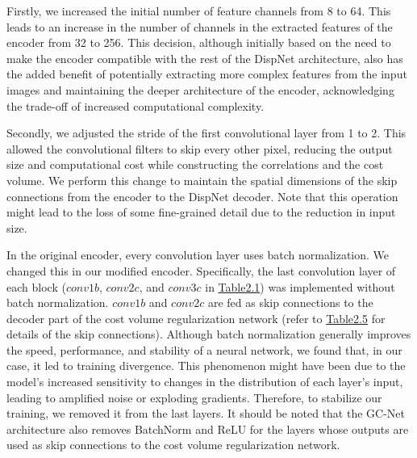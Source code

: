 \begin{enumerate}
    Firstly, we increased the initial number of feature channels from 8 to 64. This leads to an increase in the number of channels in the extracted features of the {\mvsn} encoder from 32 to 256. This decision, although initially based on the need to make the {\mvsn} encoder compatible with the rest of the DispNet architecture, also has the added benefit of potentially extracting more complex features from the input images and maintaining the deeper architecture of the {\mvsn} encoder, acknowledging the trade-off of increased computational complexity.\par
    
    Secondly, we adjusted the stride of the first convolutional layer from 1 to 2. This allowed the convolutional filters to skip every other pixel, reducing the output size and computational cost while constructing the correlations and the cost volume. We perform this change to maintain the spatial dimensions of the skip connections from the {\mvsn} encoder to the DispNet decoder. Note that this operation might lead to the loss of some fine-grained detail due to the reduction in input size. \par

    In the original {\mvsn} encoder, every convolution layer uses batch normalization. We changed this in our modified encoder. Specifically, the last convolution layer of each block ($conv1b$, $conv2c$, and $conv3c$ in \hyperref[tab:arch-mvsn]{Table2.1}) was implemented without batch normalization. $conv1b$ and $conv2c$ are fed as skip connections to the decoder part of the cost volume regularization network (refer to \hyperref[tab:arch-mvsn]{Table2.5} for details of the skip connections). Although batch normalization generally improves the speed, performance, and stability of a neural network, we found that, in our case, it led to training divergence. This phenomenon might have been due to the model's increased sensitivity to changes in the distribution of each layer's input, leading to amplified noise or exploding gradients. Therefore, to stabilize our training, we removed it from the last layers. It should be noted that the GC-Net\cite{kendall2017end} architecture also removes BatchNorm and ReLU for the layers whose outputs are used as skip connections to the cost volume regularization network. \par
    

\end{enumerate}
